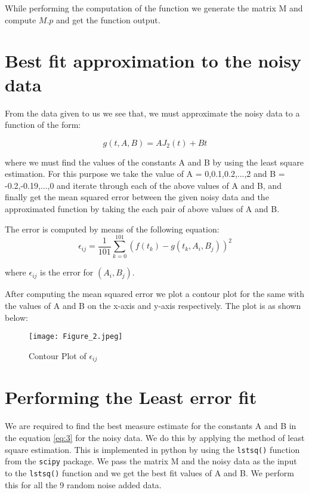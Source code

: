 \documentclass[11pt, a4paper]{article}
\begin{document}
While performing the computation of the function we generate the matrix M and compute $M.p$ and get the function output.

\section{Best fit approximation to the noisy data}

From the data given to us we see that, we must approximate the noisy data to a function of the form:

\begin{equation}\label{eq:4}
    g(t, A, B) = AJ_2(t)+Bt
\end{equation}

where we must find the values of the constants A and B by using the least square estimation. For this purpose we take the value of A = 0,0.1,0.2,...,2 and B = -0.2,-0.19,...,0 and iterate through each of the above values of A and B, and finally get the mean squared error between the given noisy data and the approximated function by taking the each pair of above values of A and B. 
\newline

The error is computed by means of the following equation:
\begin{equation}\label{eq:5}
    \epsilon_{ij} = \frac{1}{101}\sum_{k=0}^{101}(f(t_k) - g(t_k, A_i, B_j))^2
\end{equation}

where $\epsilon_{ij}$ is the error for $(A_i,B_j)$.

After computing the mean squared error we plot a contour plot for the same with the values of A and B on the x-axis and y-axis respectively. The plot is as shown below:

\begin{figure}[!tbh]
   	\centering
   	\texttt{[image: Figure\_2.jpeg]}  
   	\caption{Contour Plot of $\epsilon_{ij}$}
   	\label{fig:fig3}
   \end{figure} 
   
   
\section{Performing the Least error fit}

We are required to find the best measure estimate for the constants A and B in the equation \eqref{eq:3} for the noisy data. We do this by applying the method of least square estimation. This is implemented in python by using the \texttt{lstsq()} function from the \texttt{scipy} package. We pass the matrix M and the noisy data as the input to the \texttt{lstsq()} function and we get the best fit values of A and B. We perform this for all the 9 random noise added data.
\newline
\end{document}
